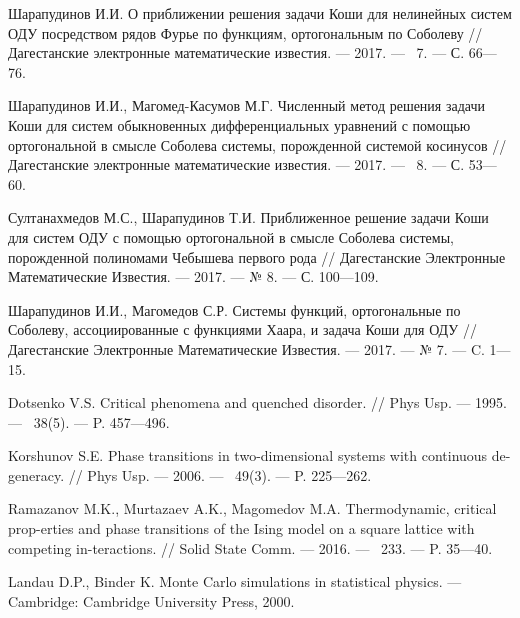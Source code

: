 \begin{thebibliography}{11}
{Шарапудинов И.И.} О приближении решения задачи Коши для нелинейных систем ОДУ посредством рядов Фурье по функциям, ортогональным по Соболеву // Дагестанские электронные математические известия. --- 2017. --- \No\ 7. --- С. 66---76.



{Шарапудинов И.И., Магомед-Касумов М.Г.} Численный метод решения задачи Коши для систем обыкновенных дифференциальных уравнений с помощью ортогональной в смысле Соболева системы, порожденной системой косинусов // Дагестанские электронные математические известия. --- 2017. --- \No\ 8. --- С. 53---60.



Султанахмедов М.С., Шарапудинов Т.И. Приближенное решение задачи Коши для систем ОДУ с помощью ортогональной в смысле Соболева системы, порожденной полиномами Чебышева первого рода // Дагестанские Электронные Математические Известия. --- 2017. --- № 8. --- С. 100---109.



Шарапудинов И.И., Магомедов С.Р. Системы функций, ортогональные по Соболеву, ассоциированные с функциями Хаара, и задача Коши для ОДУ // Дагестанские Электронные Математические Известия. --- 2017. --- № 7. --- C. 1---15.



Dotsenko V.S. Critical phenomena and quenched disorder. //
Phys Usp. --- 1995. --- \No\ 38(5). --- P. 457---496.



Korshunov S.E. Phase transitions in two-dimensional systems with continuous de-generacy. //
Phys Usp. --- 2006. --- \No\ 49(3). --- P. 225–--262.



Ramazanov M.K., Murtazaev A.K., Magomedov M.A.
Thermodynamic, critical prop-erties and phase transitions of the Ising model on a square lattice with competing in-teractions. //
Solid State Comm. --- 2016. --- \No\ 233. --- P. 35---40.



Landau D.P., Binder K.
Monte Carlo simulations in statistical physics. --- Cambridge: Cambridge University Press, 2000.







\end{thebibliography}
